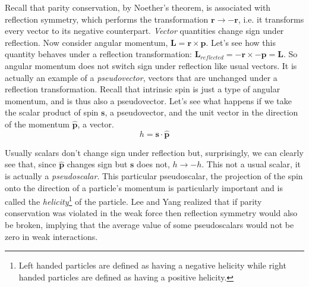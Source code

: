 \documentclass[12pt]{book}
\begin{document}
Recall that parity conservation, by Noether's theorem, is associated with reflection symmetry, which performs the transformation $\mathbf{r}\longrightarrow -\mathbf{r}$, i.e. it transforms every vector to its negative counterpart. \emph{Vector} quantities change sign under reflection. Now consider angular momentum, $\mathbf{L}=\mathbf{r}\times \mathbf{p}$. Let's see how this quantity behaves under a reflection transformation: $\mathbf{L}_{reflected}=-\mathbf{r}\times -\mathbf{p}=\mathbf{L}$. So angular momentum does not switch sign under reflection like usual vectors. It is actually an example of a \emph{pseudovector}, vectors that are unchanged under a reflection transformation. Recall that intrinsic spin is just a type of angular momentum, and is thus also a pseudovector. Let's see what happens if we take the scalar product of spin $\mathbf{s}$, a pseudovector, and the unit vector in the direction of the momentum $\hat{\mathbf{p}}$, a vector.
\begin{equation}\label{helicity}
 h=\mathbf{s}\cdot \hat{\mathbf{p}}
\end{equation}

Usually scalars don't change sign under reflection but, surprisingly, we can clearly see that, since $\hat{\mathbf{p}}$ changes sign but $\mathbf{s}$ does not, $h\longrightarrow -h$. This not a usual scalar, it is actually a \emph{pseudoscalar}. This particular pseudoscalar, the projection of the spin onto the direction of a particle's momentum is particularly important and is called the \emph{helicity}\footnote{Left handed particles are defined as having a negative helicity while right handed particles are defined as having a positive helicity.} of the particle. Lee and Yang realized that if parity conservation was violated in the weak force then reflection symmetry would also be broken, implying that the average value of some pseudoscalars would not be zero in weak interactions.
\end{document}
